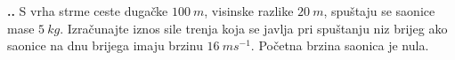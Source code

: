 
\noindent 
\textbf{
\thecjelina.\thezadatak.}
S vrha strme ceste duga\v{c}ke $100\ m$, visinske razlike $20\ m$, spu\v{s}taju se saonice mase $5\ kg$.
Izra\v{c}unajte iznos sile trenja koja se javlja pri spu\v{s}tanju niz brijeg ako saonice na dnu brijega
imaju brzinu $16\ ms^{-1}$. Po\v{c}etna brzina saonica je nula.

